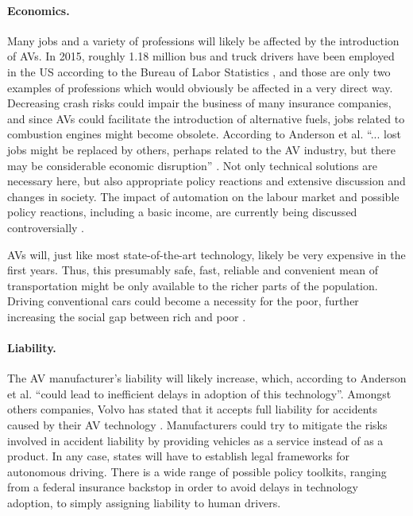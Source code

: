 \documentclass[11pt]{article}
\begin{document}
\paragraph{Economics.}
Many jobs and a variety of professions will likely be affected by the introduction of AVs. In 2015, roughly 1.18 million bus and truck drivers have been employed in the US according to the Bureau of Labor Statistics \cite{USLabourBureau2016}, and those are only two examples of professions which would obviously be affected in a very direct way. Decreasing crash risks could impair the business of many insurance companies, and since AVs could facilitate the introduction of alternative fuels, jobs related to combustion engines might become obsolete. According to Anderson et al. ``... lost jobs might be replaced by others, perhaps related to the AV industry, but there may be considerable economic disruption'' \cite[p. 40ff]{Anderson2014rand}. Not only technical solutions are necessary here, but also appropriate policy reactions and extensive discussion and changes in society. The impact of automation on the labour market and possible policy reactions, including a basic income, are currently being discussed controversially \cite{VanDerVeen2002, Olsen2014}.

AVs will, just like most state-of-the-art technology, likely be very expensive in the first years. Thus, this presumably safe, fast, reliable and convenient mean of transportation might be only available to the richer parts of the population. Driving conventional cars could become a necessity for the poor, further increasing the social gap between rich and poor \cite[p. 39]{Anderson2014rand}.

\paragraph{Liability.}
The AV manufacturer's liability will likely increase, which, according to Anderson et al. ``could lead to inefficient delays in adoption of this technology''. Amongst others companies, Volvo has stated that it accepts full liability for accidents caused by their AV technology \cite{HarrisVolvo2015}. Manufacturers could try to mitigate the risks involved in accident liability by providing vehicles as a service instead of as a product. In any case, states will have to establish legal frameworks for autonomous driving. There is a wide range of possible policy toolkits, ranging from a federal insurance backstop in order to avoid delays in technology adoption, to simply assigning liability to human drivers.
\end{document}

